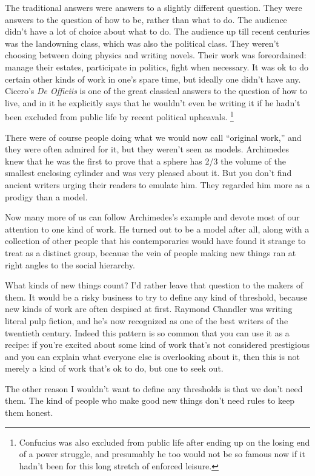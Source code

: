 \documentclass[12pt]{book}
\begin{document}
The traditional answers were answers to a slightly different question.
They were answers to the question of how to be, rather than what to do.
The audience didn't have a lot of choice about what to do. The audience
up till recent centuries was the landowning class, which was also the
political class. They weren't choosing between doing physics and writing
novels. Their work was foreordained: manage their estates, participate
in politics, fight when necessary. It was ok to do certain other kinds
of work in one's spare time, but ideally one didn't have any. Cicero's
\emph{De Officiis} is one of the great classical answers to the question
of how to live, and in it he explicitly says that he wouldn't even be
writing it if he hadn't been excluded from public life by recent
political upheavals. \footnote{Confucius was also excluded from public life after ending up on
the losing end of a power struggle, and presumably he too would not be
so famous now if it hadn't been for this long stretch of enforced
leisure.}

There were of course people doing what we would now call ``original
work,'' and they were often admired for it, but they weren't seen as
models. Archimedes knew that he was the first to prove that a sphere has
2/3 the volume of the smallest enclosing cylinder and was very pleased
about it. But you don't find ancient writers urging their readers to
emulate him. They regarded him more as a prodigy than a model.

Now many more of us can follow Archimedes's example and devote most of
our attention to one kind of work. He turned out to be a model after
all, along with a collection of other people that his contemporaries
would have found it strange to treat as a distinct group, because the
vein of people making new things ran at right angles to the social
hierarchy.

What kinds of new things count? I'd rather leave that question to the
makers of them. It would be a risky business to try to define any kind
of threshold, because new kinds of work are often despised at first.
Raymond Chandler was writing literal pulp fiction, and he's now
recognized as one of the best writers of the twentieth century. Indeed
this pattern is so common that you can use it as a recipe: if you're
excited about some kind of work that's not considered prestigious and
you can explain what everyone else is overlooking about it, then this is
not merely a kind of work that's ok to do, but one to seek out.

The other reason I wouldn't want to define any thresholds is that we
don't need them. The kind of people who make good new things don't need
rules to keep them honest.
\end{document}
